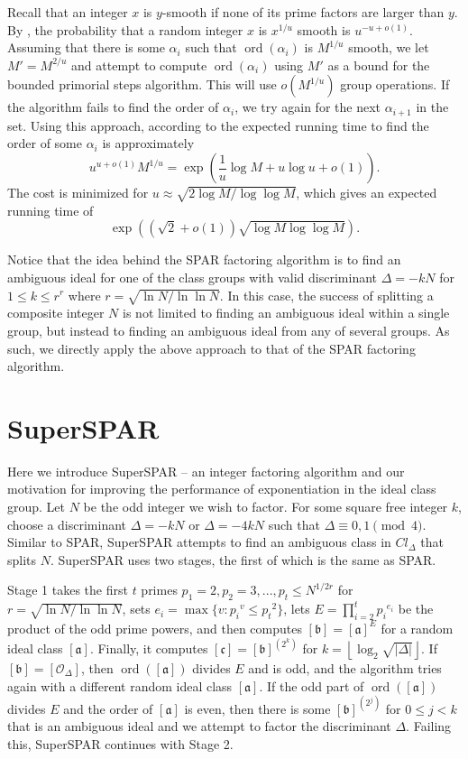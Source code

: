 \documentclass{ucalgthes1}
\theoremstyle{definition}
\DeclareMathOperator{\ord}{ord}
\newcommand{\floor}[1]{\left\lfloor #1 \right\rfloor}
\newcommand{\aclass}{[\mathfrak a]}
\newcommand{\bclass}{[\mathfrak b]}
\newcommand{\cclass}{[\mathfrak c]}
\newcommand{\idclass}{[\mathcal O_\Delta]}
\begin{document}
Recall that an integer $x$ is $y$-smooth if none of its prime factors are larger than $y$.  By \cite[p.81]{Sutherland2007}, the probability that a random integer $x$ is $x^{1/u}$ smooth is $u^{-u+o(1)}$.  Assuming that there is some $\alpha_i$ such that $\ord(\alpha_i)$ is $M^{1/u}$ smooth, we let $M'=M^{2/u}$ and attempt to compute $\ord(\alpha_i)$ using $M'$ as a bound for the bounded primorial steps algorithm.  This will use $o(M^{1/u})$ group operations.  If the algorithm fails to find the order of $\alpha_i$, we try again for the next $\alpha_{i+1}$ in the set.  Using this approach, according to \cite[pp.81--82]{Sutherland2007} the expected running time to find the order of some $\alpha_i$ is approximately
\[
	u^{u+o(1)}M^{1/u} = \exp \left( \frac{1}{u}\log M + u \log u + o(1) \right).
\]
The cost is minimized for $u \approx \sqrt{2 \log M / \log \log M}$, which gives an expected running time of
\[
	\exp \left( \left( \sqrt2 + o(1) \right) \sqrt{\log M \log \log M} \right).
\]


Notice that the idea behind the SPAR factoring algorithm is to find an ambiguous ideal for one of the class groups with valid discriminant $\Delta = -kN$ for $1 \le k \le r^r$ where $r = \sqrt{\ln N / \ln \ln N}$.  In this case, the success of splitting a composite integer $N$ is not limited to finding an ambiguous ideal within a single group, but instead to finding an ambiguous ideal from any of several groups.  As such, we directly apply the above approach to that of the SPAR factoring algorithm.

\bigbreak
\section{SuperSPAR}
\label{sec:superSpar}

Here we introduce SuperSPAR -- an integer factoring algorithm and our motivation for improving the performance of exponentiation in the ideal class group.  Let $N$ be the odd integer we wish to factor.  For some square free integer $k$, choose a discriminant $\Delta = -kN$ or $\Delta = -4kN$ such that $\Delta \equiv 0, 1 \pmod 4$.  Similar to SPAR, SuperSPAR attempts to find an ambiguous class in $Cl_\Delta$ that splits $N$.  SuperSPAR uses two stages, the first of which is the same as SPAR.

Stage 1 takes the first $t$ primes $p_1 = 2, p_2 = 3, ..., p_t \le N^{1/2r}$ for $r = \sqrt{\ln N / \ln \ln N}$, sets $e_i = \max \{ v : {p_i}^v \le {p_t}^2 \}$, lets $E = \prod_{i=2}^t {p_i}^{e_i}$ be the product of the odd prime powers, and then computes $\bclass = \aclass^E$ for a random ideal class $\aclass$.  Finally, it computes $\cclass = {\bclass}^{\left(2^k\right)}$ for $k=\floor{\log_2 \sqrt{|\Delta|}}$.  If $\bclass = \idclass$, then $\ord(\aclass)$ divides $E$ and is odd, and the algorithm tries again with a different random ideal class $\aclass$.  If the odd part of $\ord(\aclass)$ divides $E$ and the order of $\aclass$ is even, then there is some $\bclass^{\left( 2^j \right)}$ for $0 \le j < k$ that is an ambiguous ideal and we attempt to factor the discriminant $\Delta$.  Failing this, SuperSPAR continues with Stage 2.
\end{document}
